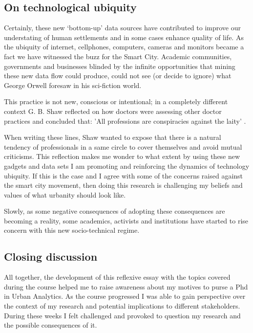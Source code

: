 \subsection{On technological ubiquity}
Certainly, these new ‘bottom-up’ data sources have contributed to improve our understating of human settlements and in some cases enhance quality of life. As the ubiquity of internet, cellphones, computers, cameras and monitors became a fact we have witnessed the buzz for the Smart City. Academic communities, governments and businesses blinded by the infinite opportunities that mining these new data flow could produce, could not see (or decide to ignore) what George Orwell foresaw in his sci-fiction world. \par

This practice is not new, conscious or intentional; in a completely different context G. B. Shaw reflected on how doctors were assessing other doctor practices and concluded that: 'All professions are conspiracies against the laity' \cite{10.1093/ije/dyg233}. \par

When writing these lines, Shaw wanted to expose that there is a natural tendency of professionals in a same circle to cover themselves and avoid mutual criticisms. This reflection makes me wonder to what extent by using these new gadgets and data sets I am promoting and reinforcing the dynamics of technology ubiquity. If this is the case and I agree with some of the concerns raised against the smart city movement, then doing this research is challenging my beliefs and values of what urbanity should look like. \par

Slowly, as some negative consequences of adopting these consequences are becoming a reality, some academics, activists and institutions have started to rise concern with this new socio-technical regime. \par




\subsection{Closing discussion}
All together, the development of this reflexive essay with the topics covered during the course helped me to raise awareness about my motives to purse a Phd in Urban Analytics. As the course progressed I was able to gain perspective over the context of my research and potential implications to different stakeholders. During these weeks I felt challenged and provoked to question my research and the possible consequences of it. \par 

